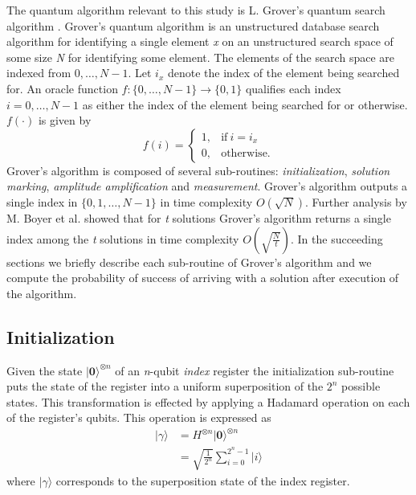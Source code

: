 The quantum algorithm relevant to this study is L. Grover's quantum search algorithm \cite{Grover1996}. Grover's quantum algorithm is an unstructured database search algorithm for identifying a single element \textit{x} on an unstructured search space of some size \textit{N} for identifying some element. The elements of the search space are indexed from $0,\ldots,N-1$. Let $i_x$ denote the index of the element being searched for. An oracle function $f:\{0,\ldots,N-1\} \rightarrow \{0,1\}$ qualifies each index $i=0,\ldots,N-1$ as either the index of the element being searched for or otherwise. $f(\cdot)$ is given by
\[
	f(i)=
	\begin{cases}
		1, & \mathrm{if}\ i=i_x\\
		0, & \mathrm{otherwise}.
	\end{cases}
\]
Grover's algorithm is composed of several sub-routines: \textit{initialization}, \textit{solution} \textit{marking}, \textit{amplitude amplification} and \textit{measurement}. Grover's algorithm outputs a single index in $\{0,1,\ldots,N-1\}$ in time complexity $O\left( \sqrt{N} \right)$. Further analysis by M. Boyer et al. \cite{Hoyer1998} showed that for \textit{t} solutions Grover's algorithm returns a single index among the \textit{t} solutions in time complexity $O\left( \sqrt{\frac{N}{t}} \right)$. In the succeeding sections we briefly describe each sub-routine of Grover's algorithm and we compute the probability of success of arriving with a solution after execution of the algorithm.

\subsection*{Initialization}
\label{sec:grover-initialization}
Given the state $\vert \mathbf{0} \rangle^{\otimes n}$ of an \textit{n}-qubit \textit{index} register the initialization sub-routine puts the state of the register into a uniform superposition of the $2^n$ possible states. This transformation is effected by applying a Hadamard operation on each of the register's qubits. This operation is expressed as
\begin{equation}
	\begin{split}
		\vert \gamma \rangle &= H^{\otimes n}\vert \mathbf{0} \rangle^{\otimes n}\\
		&= \sqrt{\frac{1}{2^n}} \sum_{i=0}^{2^n-1} \vert i \rangle
	\end{split}
\end{equation}
where $\vert \gamma \rangle$ corresponds to the superposition state of the index register.

